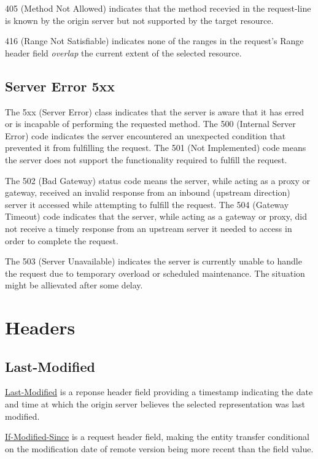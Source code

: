 405 (Method Not Allowed) indicates that the method recevied in the
request-line is known by the origin server but not supported by
the target resource.

416 (Range Not Satisfiable) indicates none of the ranges in the
request's Range header field \textit{overlap} the current extent
of the selected resource.

\subsection{Server Error 5xx}
\label{sec:server-error-5xx}

The 5xx (Server Error) class indicates that the server is aware
that it has erred or is incapable of performing the requested
method. The 500 (Internal Server Error) code indicates the server
encountered an unexpected condition that prevented it from
fulfilling the request. The 501 (Not Implemented) code means the
server does not support the functionality required to fulfill the
request.

The 502 (Bad Gateway) status code means the server, while acting
as a proxy or gateway, received an invalid response from an
inbound (upstream direction) server it accessed while attempting
to fulfill the request. The 504 (Gateway Timeout) code indicates
that the server, while acting as a gateway or proxy, did not
receive a timely response from an upstream server it needed to
access in order to complete the request.

The 503 (Server Unavailable) indicates the server is currently
unable to handle the request due to temporary overload or
scheduled maintenance. The situation might be allievated after
some delay.

\section{Headers}
\label{sec:http-headers}

\subsection{Last-Modified}
\label{sec:last-modified}

\uline{Last-Modified} is a reponse header field providing a
timestamp indicating the date and time at which the origin server
believes the selected representation was last modified.

\uline{If-Modified-Since} is a request header field, making the
entity transfer conditional on the modification date of remote
version being more recent than the field value.

